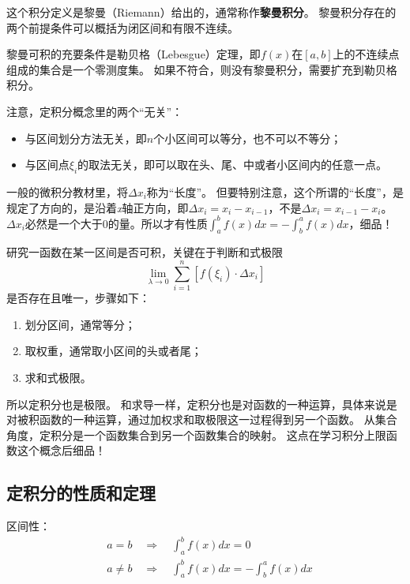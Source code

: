 这个积分定义是黎曼（Riemann）给出的，通常称作{\bf 黎曼积分}。
黎曼积分存在的两个前提条件可以概括为闭区间和有限不连续。

\begin{tcolorbox}
黎曼可积的充要条件是勒贝格（Lebesgue）定理，即$f\left( x \right) $在$\left[ a,b \right] $上的不连续点组成的集合是一个零测度集。
如果不符合，则没有黎曼积分，需要扩充到勒贝格积分。
\end{tcolorbox}

注意，定积分概念里的两个“无关”：
\begin{itemize}
    \item 与区间划分方法无关，即$n$个小区间可以等分，也不可以不等分；
    \item 与区间点$\xi _i$的取法无关，即可以取在头、尾、中或者小区间内的任意一点。
\end{itemize}

\begin{tcolorbox}
一般的微积分教材里，将$\Delta x_i$称为“长度”。
但要特别注意，这个所谓的“长度”，是规定了方向的，是沿着{\it x}轴正方向，即$\Delta x_i=x_i-x_{i-1}$，不是$\Delta x_i=x_{i-1}-x_i$。
$\Delta x_i$必然是一个大于0的量。所以才有性质$\int_a^b{f\left( x \right) dx}=-\int_b^a{f\left( x \right) dx}$，细品！
\end{tcolorbox}

研究一函数在某一区间是否可积，关键在于判断和式极限
\[
\underset{\lambda \rightarrow 0}{\lim}\sum_{i=1}^n{\left[ f\left( \xi _i \right) \cdot \Delta x_i \right]}
\]
是否存在且唯一，步骤如下：
\begin{enumerate}
    \item 划分区间，通常等分；
    \item 取权重，通常取小区间的头或者尾；
    \item 求和式极限。
\end{enumerate}
所以定积分也是极限。
和求导一样，定积分也是对函数的一种运算，具体来说是对被积函数的一种运算，通过加权求和取极限这一过程得到另一个函数。
从集合角度，定积分是一个函数集合到另一个函数集合的映射。
这点在学习积分上限函数这个概念后细品！

\subsection{定积分的性质和定理}

区间性：
\begin{align*}
&a=b \quad \Rightarrow \quad \int_a^b{f\left( x \right) dx}=0 \\
&a\ne b \quad \Rightarrow \quad \int_a^b{f\left( x \right) dx}=-\int_b^a{f\left( x \right) dx}
\end{align*}


